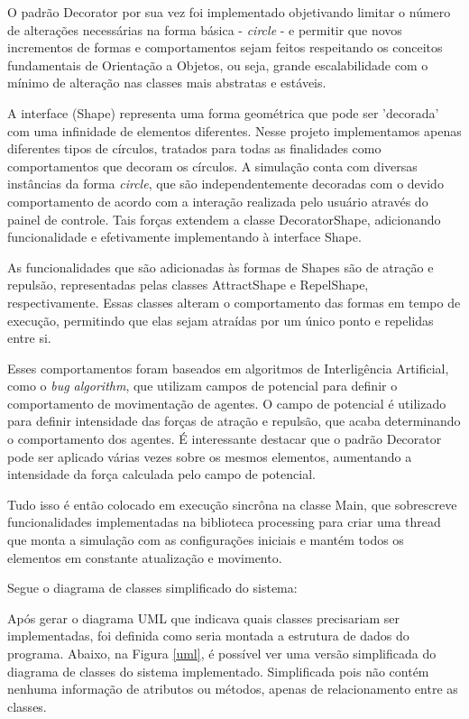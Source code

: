 \documentclass[12pt]{article}
\begin{document}
O padrão Decorator por sua vez foi implementado objetivando limitar o número de alterações necessárias na forma básica - \textit{circle} - e
permitir que novos incrementos de formas e comportamentos sejam feitos respeitando os conceitos fundamentais de Orientação a Objetos, ou seja,
grande escalabilidade com o mínimo de alteração nas classes mais abstratas e estáveis. 

A interface (Shape) representa uma forma geométrica que pode ser 'decorada' com uma infinidade de elementos diferentes. Nesse projeto
implementamos apenas diferentes tipos de círculos, tratados para todas as finalidades como comportamentos que decoram os círculos. A simulação conta com
diversas instâncias da forma \textit{circle}, que são independentemente decoradas com o devido comportamento de acordo com a interação realizada pelo usuário
através do painel de controle. Tais forças extendem a classe DecoratorShape, adicionando funcionalidade e efetivamente implementando à interface Shape.

As funcionalidades que são adicionadas às formas de Shapes são de atração e repulsão, representadas pelas classes AttractShape e RepelShape, respectivamente. Essas classes alteram o comportamento das formas em tempo de execução, permitindo que elas sejam atraídas por um único ponto e repelidas entre si. 

Esses comportamentos foram baseados em algoritmos de Interligência Artificial, como o \textit{bug algorithm}, que utilizam campos de potencial para definir o comportamento de movimentação de agentes. O campo de potencial é utilizado para definir intensidade das forças de atração e repulsão, que acaba determinando o comportamento dos agentes. É interessante destacar que o padrão Decorator pode ser aplicado várias vezes sobre os mesmos elementos, aumentando a intensidade da força calculada pelo campo de potencial.

Tudo isso é então colocado em execução sincrôna na classe Main, que sobrescreve funcionalidades implementadas na biblioteca processing para criar uma thread
que monta a simulação com as configurações iniciais e mantém todos os elementos em constante atualização e movimento.

Segue o diagrama de classes simplificado do sistema:

Após gerar o diagrama UML que indicava quais classes precisariam ser implementadas, foi definida como seria montada a estrutura de dados do programa. Abaixo, na Figura \ref{uml}, é possível ver uma versão simplificada do diagrama de classes do sistema implementado. Simplificada pois não contém nenhuma informação de atributos ou métodos, apenas de relacionamento entre as classes. 
\end{document}
